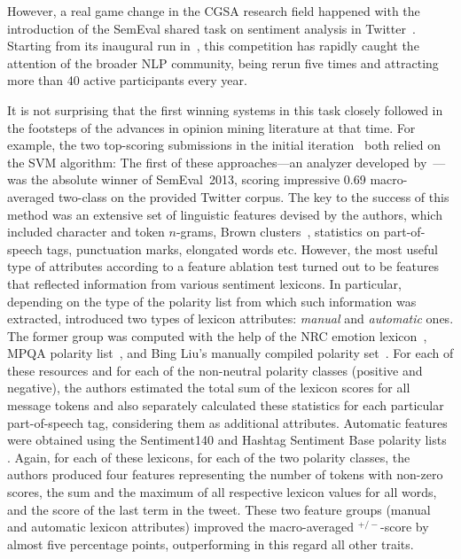 However, a real game change in the CGSA research field happened with
the introduction of the SemEval shared task on sentiment analysis in
Twitter~\cite{Nakov:13}.  Starting from its inaugural run
in~\citeyear{Nakov:13}, this competition has rapidly caught the
attention of the broader NLP community, being rerun five times and
attracting more than 40 active participants every year.

It is not surprising that the first winning systems in this task
closely followed in the footsteps of the advances in opinion mining
literature at that time.  For example, the two top-scoring submissions
in the initial iteration~\cite{Mohammad:13,Guenther:13} both relied on
the SVM algorithm: The first of these approaches---an analyzer
developed by~\citet{Mohammad:13}---was the absolute winner of
SemEval~2013, scoring impressive 0.69 macro-averaged two-class \F{} on
the provided Twitter corpus.  The key to the success of this method
was an extensive set of linguistic features devised by the authors,
which included character and token $n$-grams, Brown
clusters~\cite{Brown:92}, statistics on part-of-speech tags,
punctuation marks, elongated words etc.  However, the most useful type
of attributes according to a feature ablation test turned out to be
features that reflected information from various sentiment lexicons.
In particular, depending on the type of the polarity list from which
such information was extracted, \citeauthor{Mohammad:13} introduced
two types of lexicon attributes: \emph{manual} and \emph{automatic}
ones.  The former group was computed with the help of the NRC emotion
lexicon~\cite{Mohammad:13a}, MPQA polarity list~\cite{Wilson:05}, and
Bing Liu's manually compiled polarity set~\cite{Hu:04}.  For each of
these resources and for each of the non-neutral polarity classes
(positive and negative), the authors estimated the total sum of the
lexicon scores for all message tokens and also separately calculated
these statistics for each particular part-of-speech tag, considering
them as additional attributes.  Automatic features were obtained using
the Sentiment140 and Hashtag Sentiment Base polarity lists
\cite{Kiritchenko:14}.  Again, for each of these lexicons, for each of
the two polarity classes, the authors produced four features
representing the number of tokens with non-zero scores, the sum and
the maximum of all respective lexicon values for all words, and the
score of the last term in the tweet.  These two feature groups (manual
and automatic lexicon attributes) improved the macro-averaged
\F{}$^{+/-}$-score by almost five percentage points, outperforming in
this regard all other traits.

